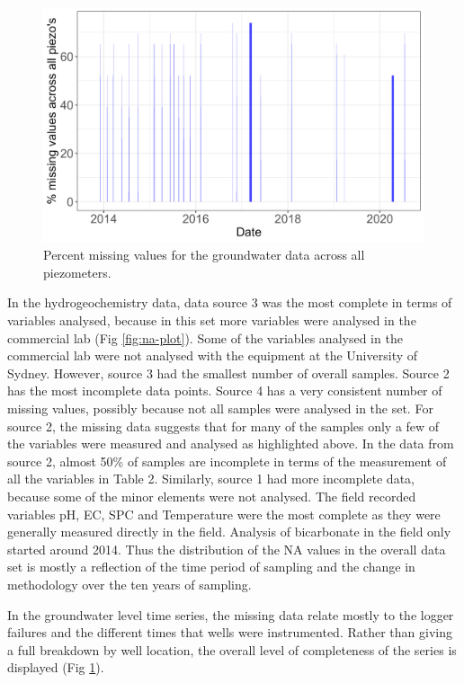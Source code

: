 \documentclass[, manuscript]{copernicus}
\begin{document}
\begin{figure}
\includegraphics[width=0.9\linewidth]{Figures/na_GW} \caption{Percent missing values for the groundwater data across all piezometers.}\label{fig:gw-na-plot}
\end{figure}

In the hydrogeochemistry data, data source 3 was the most complete in
terms of variables analysed, because in this set more variables were
analysed in the commercial lab (Fig \ref{fig:na-plot}). Some of the
variables analysed in the commercial lab were not analysed with the
equipment at the University of Sydney. However, source 3 had the
smallest number of overall samples. Source 2 has the most incomplete
data points. Source 4 has a very consistent number of missing values,
possibly because not all samples were analysed in the set. For source 2,
the missing data suggests that for many of the samples only a few of the
variables were measured and analysed as highlighted above. In the data
from source 2, almost 50\% of samples are incomplete in terms of the
measurement of all the variables in Table 2. Similarly, source 1 had
more incomplete data, because some of the minor elements were not
analysed. The field recorded variables pH, EC, SPC and Temperature were
the most complete as they were generally measured directly in the field.
Analysis of bicarbonate in the field only started around 2014. Thus the
distribution of the NA values in the overall data set is mostly a
reflection of the time period of sampling and the change in methodology
over the ten years of sampling.

In the groundwater level time series, the missing data relate mostly to
the logger failures and the different times that wells were
instrumented. Rather than giving a full breakdown by well location, the
overall level of completeness of the series is displayed (Fig
\ref{fig:gw-na-plot}).
\end{document}
